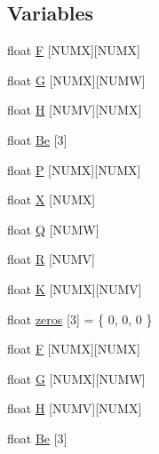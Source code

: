 \subsection*{Variables}
\begin{DoxyCompactItemize}
\item 
float \hyperlink{group___i_n_s_g_p_s_ga8df5a9c6b80931e9a78e1ce3aa7fc8d7}{F} \mbox{[}N\-U\-M\-X\mbox{]}\mbox{[}N\-U\-M\-X\mbox{]}
\item 
float \hyperlink{group___i_n_s_g_p_s_ga728acb2fd56f38a4cab69ede7b3a027e}{G} \mbox{[}N\-U\-M\-X\mbox{]}\mbox{[}N\-U\-M\-W\mbox{]}
\item 
float \hyperlink{group___i_n_s_g_p_s_ga4080397a0d248e4c99d6f284b187f206}{H} \mbox{[}N\-U\-M\-V\mbox{]}\mbox{[}N\-U\-M\-X\mbox{]}
\item 
float \hyperlink{group___i_n_s_g_p_s_gab41e99aaac91af4fb41d43cb5a869e59}{Be} \mbox{[}3\mbox{]}
\item 
float \hyperlink{group___i_n_s_g_p_s_gaa4dd4832559078fffbbe0afa316c216c}{P} \mbox{[}N\-U\-M\-X\mbox{]}\mbox{[}N\-U\-M\-X\mbox{]}
\item 
float \hyperlink{group___i_n_s_g_p_s_ga878335db1805364cefebddb5eccfc282}{X} \mbox{[}N\-U\-M\-X\mbox{]}
\item 
float \hyperlink{group___i_n_s_g_p_s_ga9403e530c40ea2ed78fba00336d98645}{Q} \mbox{[}N\-U\-M\-W\mbox{]}
\item 
float \hyperlink{group___i_n_s_g_p_s_ga06fb8e491fbcc3c8cbe00ccaa0aa1aa7}{R} \mbox{[}N\-U\-M\-V\mbox{]}
\item 
float \hyperlink{group___i_n_s_g_p_s_ga1a9a9b26f7cab8703fc488c6cc258490}{K} \mbox{[}N\-U\-M\-X\mbox{]}\mbox{[}N\-U\-M\-V\mbox{]}
\item 
float \hyperlink{group___i_n_s_g_p_s_ga37df636c79e0bd4b3fab83292679a4b0}{zeros} \mbox{[}3\mbox{]} = \{ 0, 0, 0 \}
\item 
float \hyperlink{group___i_n_s_g_p_s_ga8df5a9c6b80931e9a78e1ce3aa7fc8d7}{F} \mbox{[}N\-U\-M\-X\mbox{]}\mbox{[}N\-U\-M\-X\mbox{]}
\item 
float \hyperlink{group___i_n_s_g_p_s_ga728acb2fd56f38a4cab69ede7b3a027e}{G} \mbox{[}N\-U\-M\-X\mbox{]}\mbox{[}N\-U\-M\-W\mbox{]}
\item 
float \hyperlink{group___i_n_s_g_p_s_ga4080397a0d248e4c99d6f284b187f206}{H} \mbox{[}N\-U\-M\-V\mbox{]}\mbox{[}N\-U\-M\-X\mbox{]}
\item 
float \hyperlink{group___i_n_s_g_p_s_gab41e99aaac91af4fb41d43cb5a869e59}{Be} \mbox{[}3\mbox{]}
\item 

\end{DoxyCompactItemize}
